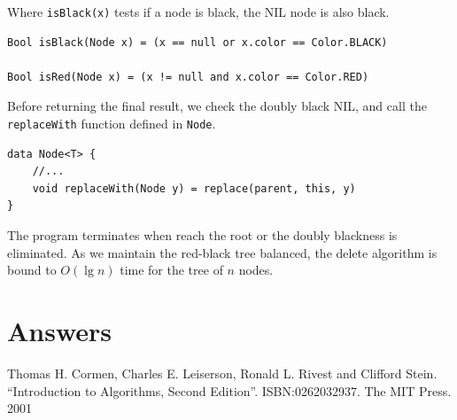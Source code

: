 \documentclass[b5paper]{article}
\begin{document}
Where \texttt{isBlack(x)} tests if a node is black, the NIL node is also black.

\begin{lstlisting}[language = Bourbaki]
Bool isBlack(Node x) = (x == null or x.color == Color.BLACK)

Bool isRed(Node x) = (x != null and x.color == Color.RED)
\end{lstlisting}

Before returning the final result, we check the doubly black NIL, and call the \texttt{replaceWith} function defined in \texttt{Node}.

\begin{lstlisting}[language = Bourbaki]
data Node<T> {
    //...
    void replaceWith(Node y) = replace(parent, this, y)
}
\end{lstlisting}

The program terminates when reach the root or the doubly blackness is eliminated. As we maintain the red-black tree balanced, the delete algorithm is bound to $O(\lg n)$ time for the tree of $n$ nodes.

\begin{Exercise}
\end{Exercise}

\ifx\wholebook\relax \else
\section{Answers}
\shipoutAnswer

\begin{thebibliography}{99}

Thomas H. Cormen, Charles E. Leiserson, Ronald L. Rivest and Clifford Stein.
``Introduction to Algorithms, Second Edition''. ISBN:0262032937. The MIT Press. 2001

\end{thebibliography}

\expandafter\enddocument
\fi
\end{document}

